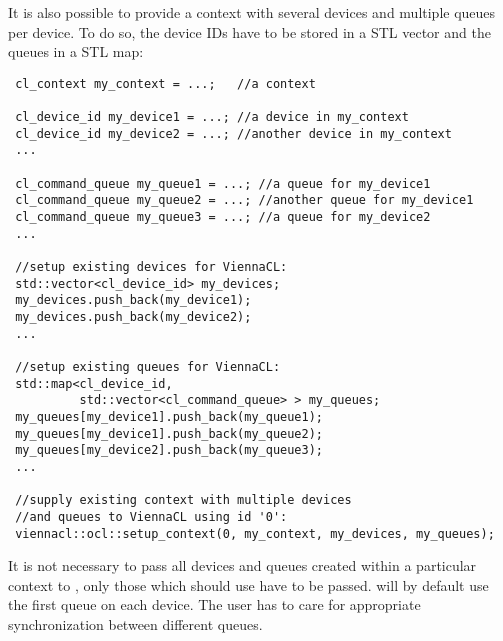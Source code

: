 It is also possible to provide a context with several devices and multiple queues per device. To do so, the device IDs have to be stored in a STL vector
and the queues in a STL map:
\begin{lstlisting}
 cl_context my_context = ...;   //a context

 cl_device_id my_device1 = ...; //a device in my_context
 cl_device_id my_device2 = ...; //another device in my_context
 ...

 cl_command_queue my_queue1 = ...; //a queue for my_device1
 cl_command_queue my_queue2 = ...; //another queue for my_device1
 cl_command_queue my_queue3 = ...; //a queue for my_device2
 ...

 //setup existing devices for ViennaCL:
 std::vector<cl_device_id> my_devices;
 my_devices.push_back(my_device1);
 my_devices.push_back(my_device2);
 ...

 //setup existing queues for ViennaCL:
 std::map<cl_device_id,
          std::vector<cl_command_queue> > my_queues;
 my_queues[my_device1].push_back(my_queue1);
 my_queues[my_device1].push_back(my_queue2);
 my_queues[my_device2].push_back(my_queue3);
 ...

 //supply existing context with multiple devices
 //and queues to ViennaCL using id '0':
 viennacl::ocl::setup_context(0, my_context, my_devices, my_queues);
\end{lstlisting}
It is not necessary to pass all devices and queues created within a particular context to {\ViennaCL}, only those which {\ViennaCL} should use have to be passed.
{\ViennaCL} will by default use the first queue on each device. The user has to care for appropriate synchronization between different queues.


